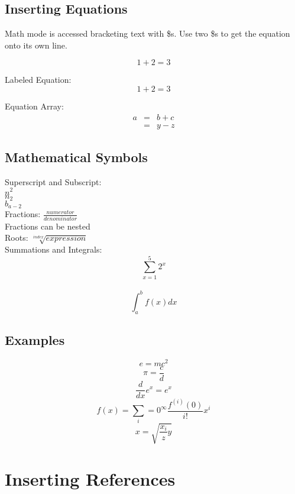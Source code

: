 \documentclass[a4paper, 12pt]{article}
\begin{document}
\subsection{Inserting Equations}

Math mode is accessed bracketing text with \$s.  Use two \$s to get the equation onto its own line.

$$1+2=3$$

Labeled Equation:
\begin{equation}
1+2=3
\end{equation}

Equation Array:
\begin{eqnarray}
a & = & b + c\\
{} & = & y - z
\end{eqnarray}

\subsection{Mathematical Symbols}
Superscript and Subscript:\\
$n^2$\\
$n_2$\\
$b_{a-2}$\\

Fractions:
$\frac{numerator}{denominator}$\\
Fractions can be nested\\

Roots:
$\sqrt[index]{expression}$\\

Summations and Integrals:
$$\sum_{x=1}^5 2^x$$\\
$$\int_a^b f(x)dx$$

\subsection{Examples}
\begin{equation}
e = mc^2
\end{equation}
\begin{equation}
\pi = \frac{c}{d}
\end{equation}
\begin{equation}
\frac{d}{dx}e^x = e^x
\end{equation}
\begin{equation}
f(x) = \sum_i = 0^\infty \frac{f^{(i)} (0)}{i!}x^i
\end{equation}
\begin{equation}
x = \sqrt{\frac{x_i}{z} y}
\end{equation}

\section{Inserting References}
\end{document}
